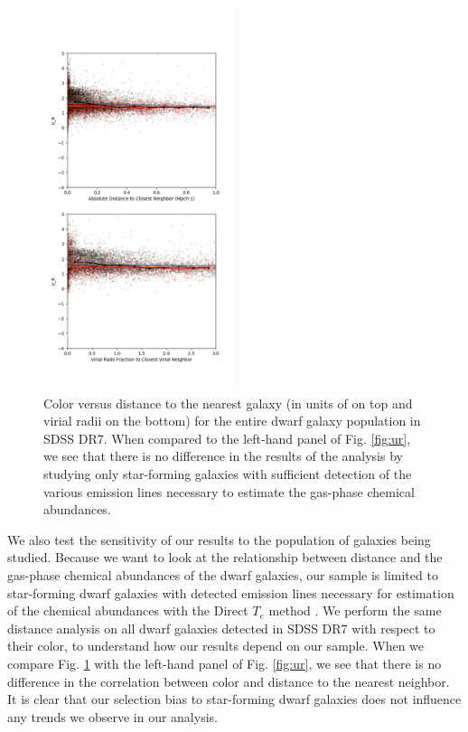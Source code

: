 \begin{figure}
    \includegraphics[width=0.5\textwidth]{Images/smallScaleEnvironment/ALLdwarf_ur_300}
    \caption[Color versus distance of full SDSS dwarf population]{Color versus 
    distance to the nearest galaxy (in units of \hMpc on top and virial radii on 
    the bottom) for the entire dwarf galaxy population in SDSS DR7.  When 
    compared to the left-hand panel of Fig. \ref{fig:ur}, we see that there is 
    no difference in the results of the analysis by studying only star-forming 
    galaxies with sufficient detection of the various emission lines necessary 
    to estimate the gas-phase chemical abundances.}
    \label{fig:ur_allDwarf}
\end{figure}

We also test the sensitivity of our results to the population of galaxies being 
studied.  Because we want to look at the relationship between distance and the 
gas-phase chemical abundances of the dwarf galaxies, our sample is limited to 
star-forming dwarf galaxies with detected emission lines necessary for 
estimation of the chemical abundances with the Direct $T_e$ method 
\citep[see][for more details]{Douglass17a}.  We perform the same distance 
analysis on all dwarf galaxies detected in SDSS DR7 with respect to their 
color, to understand how our results depend on our sample.  When we compare Fig. 
\ref{fig:ur_allDwarf} with the left-hand panel of Fig. \ref{fig:ur}, we see that 
there is no difference in the correlation between color and distance to the 
nearest neighbor.  It is clear that our selection bias to star-forming dwarf 
galaxies does not influence any trends we observe in our analysis.

